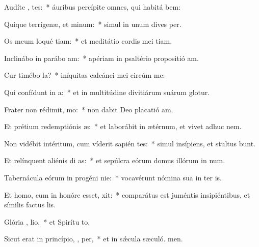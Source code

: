 \item Audíte ,  tes:~* áuribus percípite omnes, qui habitá bem:
\item Quique terrígenæ, et  minum:~* simul in unum dives  per.
\item Os meum loqué tiam:~* et meditátio cordis mei tiam.
\item Inclinábo in parábo  am:~* apériam in psaltério propositió am.
\item Cur timébo   la?~* iníquitas calcánei mei circúm me:
\item Qui confídunt in  a:~* et in multitúdine divitiárum suárum glotur.
\item Frater non rédimit,  mo:~* non dabit Deo placatió am.
\item Et prétium redemptiónis  æ:~* et laborábit in ætérnum, et vivet adhuc  nem.
\item Non vidébit intéritum, cum víderit sapién tes:~* simul insípiens, et stultus bunt.
\item Et relínquent aliénis di as:~* et sepúlcra eórum domus illórum in num.
\item Tabernácula eórum in progéni  nie:~* vocavérunt nómina sua in ter is.
\item Et homo, cum in honóre esset,  xit:~* comparátus est juméntis insipiéntibus, et símilis factus  lis.
\item Glória ,  lio,~* et Spirítu to.
\item Sicut erat in princípio,  ,  per,~* et in sǽcula sæculó. men.
